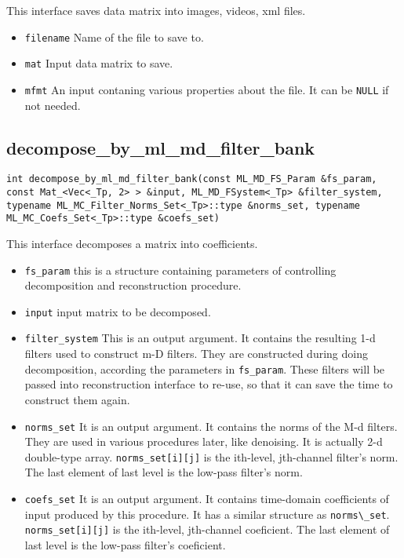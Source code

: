 \documentclass[a4paper,5pt]{article}
\begin{document}
This interface saves data matrix into images, videos, xml files.

\begin{itemize}
\item \lstinline{filename} Name of the file to save to.
\item \lstinline{mat} Input data matrix to save.
\item \lstinline{mfmt} An input contaning various properties about the file. It can be \lstinline{NULL} if not needed.
\end{itemize}

\subsection{decompose\_by\_ml\_md\_filter\_bank}

\lstinline {int decompose_by_ml_md_filter_bank(const ML_MD_FS_Param &fs_param, const Mat_<Vec<_Tp, 2> > &input, ML_MD_FSystem<_Tp> &filter_system, typename ML_MC_Filter_Norms_Set<_Tp>::type &norms_set, typename ML_MC_Coefs_Set<_Tp>::type &coefs_set) }

This interface decomposes a matrix into coefficients.
\begin{itemize}
\item \lstinline{fs_param} this is a structure containing parameters of controlling decomposition and reconstruction procedure.
\item \lstinline{input} input matrix to be decomposed.
\item \lstinline{filter_system}  This is an output argument. It contains the resulting 1-d filters used to construct m-D filters. They are constructed during doing decomposition, according the parameters in \lstinline{fs_param}. These filters will be passed into reconstruction interface to re-use, so that it can save the time to construct them again.
\item \lstinline{norms_set} It is an output argument. It contains the norms of the M-d filters. They are used in various procedures later, like denoising. It is actually 2-d double-type array. \lstinline{norms_set[i][j]} is the ith-level, jth-channel filter's norm. The last element of last level is the low-pass filter's norm.
\item \lstinline{coefs_set} It is an output argument. It contains time-domain coefficients of input produced by this procedure. It has a similar structure as \lstinline{norms\_set}. \lstinline{norms_set[i][j]} is the ith-level, jth-channel coeficient. The last element of last level is the low-pass filter's coeficient.
\end{itemize}
\end{document}
